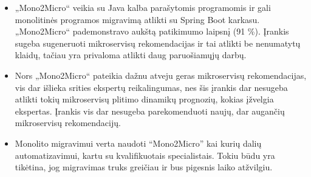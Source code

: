 \documentclass{VUMIFPSbakalaurinis}
\begin{document}
\begin{itemize}
    \item „Mono2Micro“ veikia su Java kalba parašytomis programomis ir gali monolitinės programos migravimą atlikti su Spring Boot karkasu. „Mono2Micro“ pademonstravo aukštą patikimumo laipsnį (91 \%). Įrankis sugeba sugeneruoti mikroservisų rekomendacijas ir tai atlikti be nenumatytų klaidų, tačiau yra privaloma atlikti daug paruošiamųjų darbų.

    \item Nors „Mono2Micro“ pateikia dažnu atveju geras mikroservisų rekomendacijas, vis dar išlieka srities ekspertų reikalingumas, nes šis įrankis dar nesugeba atlikti tokių mikroservisų plitimo dinamikų prognozių, kokias įžvelgia ekspertas. Įrankis vis dar nesugeba parekomenduoti naujų, dar augančių mikroservisų rekomendacijų.

    \item Monolito migravimui verta naudoti \enquote{Mono2Micro} kai kurių dalių automatizavimui, kartu su kvalifikuotais specialistais. Tokiu būdu yra tikėtina, jog migravimas truks greičiau ir bus pigesnis laiko atžvilgiu.





\end{itemize}

\printbibliography[heading=bibintoc]

\appendix  %
\end{document}
